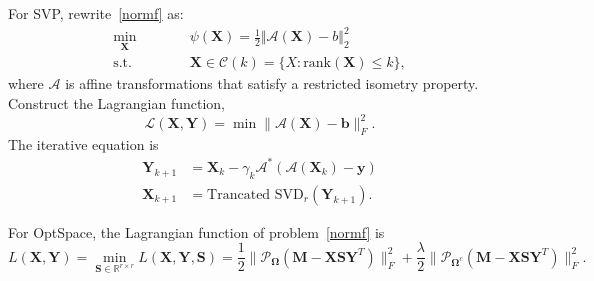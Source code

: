 \documentclass{article}
\begin{document}
{For SVP, rewrite~\eqref{normf} as:
\begin{equation}
    \begin{aligned}
        \min_{\mathbf X}\qquad&\quad \psi (\mathbf X) = \frac{1}{2}\Vert \mathcal{A}(\mathbf X) - b\Vert_2^2\\
        \text{s.t.}\qquad&\quad\mathbf X \in \mathcal{C}(k) = \{X \colon \text{rank}(\mathbf X) \leq k\},
    \end{aligned}
\end{equation}
where $\mathcal{A}$ is affine transformations that satisfy a restricted isometry property.
Construct the Lagrangian function,
\begin{equation}
    \mathcal{L}(\mathbf X,\mathbf Y) = \min \lVert \mathcal{A}(\mathbf X) -\mathbf b \rVert_F^2.
\end{equation}
The iterative equation is
\begin{equation}
    \begin{aligned}
        \mathbf Y_{k+1} & = \mathbf X_{k} - \gamma_k \mathcal{A}^*(\mathcal{A}(\mathbf X_k)-\mathbf y)\\
        \mathbf X_{k+1} & = \text{Trancated SVD}_r(\mathbf Y_{k+1}).
    \end{aligned}
\end{equation}

For OptSpace, the Lagrangian function of problem~\eqref{normf} is
\begin{equation}
    L(\mathbf X,\mathbf Y) = \min_{\mathbf S\in\mathbb R^{r\times r}} L(\mathbf X,\mathbf Y,\mathbf S) = \frac{1}{2}\lVert\mathcal P_{\mathbf\Omega}(\mathbf M-\mathbf X\mathbf S\mathbf Y^T)\rVert^2_F + \frac{\lambda}{2}\lVert\mathcal P_{\mathbf\Omega^c}(\mathbf M-\mathbf X\mathbf S\mathbf Y^T)
\rVert^2_F.
\end{equation}



}
\end{document}
